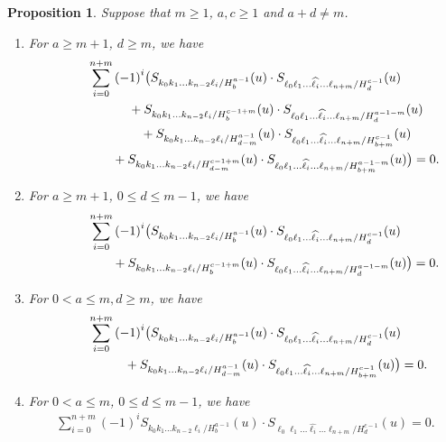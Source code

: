 \documentclass[10pt,a4paper]{amsart}
\numberwithin{equation}{section}
\newtheorem{Proposition}[Theorem]{Proposition}
 { \theoremstyle{definition}
\newtheorem{Definition}[Theorem]{Definition}
\newtheorem{Note}[Theorem]{Note}
\newtheorem{Example}[Theorem]{Example}
\newtheorem{Remark}[Theorem]{Remark} }
\begin{document}
\begin{Proposition}\label{abcd}
Suppose that $m\geq 1$, $a, c\geq 1$ and $a+d\ne m$.
\begin{enumerate}
\item[$(1)$] For $a\geq m+1$, $d\geq m$, we have
\begin{gather}
\sum_{i=0}^{n+m}{(-1)}^{i}\bigl(S_{k_0 k_1\dots k_{n-2}\ell_i/{H^{a-1}_{b}}}(u)\cdot S_{\ell_0 \ell_1\dots \widehat{\ell_{i}}\dots\ell_{n+m}/{H^{c-1}_{d}}}(u)\nonumber\\
\hphantom{\sum_{i=0}^{n+m}{(-1)}^{i}\bigl(}{}
+S_{k_0 k_1\dots k_{n-2}\ell_i/{H^{c-1+m}_{b}}}(u)\cdot S_{\ell_0 \ell_1\dots \widehat{\ell_{i}}\dots\ell_{n+m}/{H^{a-1-m}_{d}}}(u)\nonumber\\
\hphantom{\sum_{i=0}^{n+m}{(-1)}^{i}\bigl(}{}
+S_{k_0 k_1\dots k_{n-2}\ell_i/{H^{a-1}_{d-m}}}(u)\cdot S_{\ell_0 \ell_1\dots \widehat{\ell_{i}}\dots\ell_{n+m}/{H^{c-1}_{b+m}}}(u)\nonumber\\
\hphantom{\sum_{i=0}^{n+m}{(-1)}^{i}\bigl(}{}
+S_{k_0 k_1\dots k_{n-2}\ell_i/{H^{c-1+m}_{d-m}}}(u)\cdot S_{\ell_0 \ell_1\dots \widehat{\ell_{i}}\dots\ell_{n+m}/{H^{a-1-m}_{b+m}}}(u)\bigr)=0.\label{abcd1}
\end{gather}

\item[$(2)$] For $a\geq m+1$, $0\leq d\leq m-1$, we have
 \begin{gather}
\sum_{i=0}^{n+m}{(-1)}^{i}\bigl(S_{k_0 k_1\dots k_{n-2}\ell_i/{H^{a-1}_{b}}}(u)\cdot S_{\ell_0 \ell_1\dots \widehat{\ell_{i}}\dots\ell_{n+m}/{H^{c-1}_{d}}}(u)\nonumber\\
\hphantom{\sum_{i=0}^{n+m}{(-1)}^{i}\bigl(}{}
+S_{k_0 k_1\dots k_{n-2}\ell_i/{H^{c-1+m}_{b}}}(u)\cdot S_{\ell_0 \ell_1\dots \widehat{\ell_{i}}\dots\ell_{n+m}/{H^{a-1-m}_{d}}}(u)\bigr)=0.
\label{abcd2}
\end{gather}


\item[$(3)$] For $0<a\leq m,d\geq m$, we have
 \begin{gather}
\sum_{i=0}^{n+m}{(-1)}^{i}\bigl(S_{k_0 k_1\dots k_{n-2}\ell_i/{H^{a-1}_{b}}}(u)\cdot S_{\ell_0 \ell_1\dots \widehat{\ell_{i}}\dots\ell_{n+m}/{H^{c-1}_{d}}}(u)\nonumber\\
\hphantom{\sum_{i=0}^{n+m}{(-1)}^{i}\bigl(}{}
+S_{k_0 k_1\dots k_{n-2}\ell_i/{H^{a-1}_{d-m}}}(u)\cdot S_{\ell_0 \ell_1\dots \widehat{\ell_{i}}\dots\ell_{n+m}/{H^{c-1}_{b+m}}}(u)\bigr)=0.
\label{abcd3}
\end{gather}


\item[$(4)$] For $0<a\leq m$, $0\leq d\leq m-1$, we have
\begin{gather}
\sum_{i=0}^{n+m}{(-1)}^{i}S_{k_0 k_1\dots k_{n-2}\ell_i/{H^{a-1}_{b}}}(u)\cdot S_{\ell_0 \ell_1\dots \widehat{\ell_{i}}\dots\ell_{n+m}/{H^{c-1}_{d}}}(u)=0.
\label{abcd4}
\end{gather}
\end{enumerate}
\end{Proposition}
\end{document}
